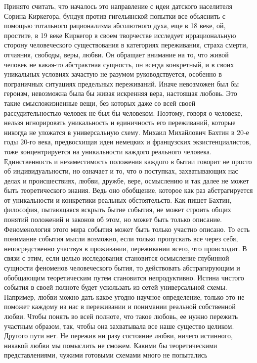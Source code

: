 Принято считать, что началось это
направление с идеи датского населителя Сорина Киркегора, бундуя против
гигельянской попытки все объяснить с помощью тотального рационализма абсолютного
духа, еще в 18 веке, ой, простите, в 19 веке Киркегор в своем творчестве
исследует иррациональную сторону человеческого существования в категориях
переживания, страха смерти, отчаяния, свободы, веры, любви. Он обращает внимание
на то, что живой человек не какая-то абстрактная сущность, он всегда конкретный,
и в своих уникальных условиях зачастую не разумом руководствуется, особенно в
пограничных ситуациях предельных переживаний. Иначе невозможен был бы героизм,
невозможна была бы живая искренняя вера, настоящая любовь. Это такие
смысложизненные вещи, без которых даже со всей своей рассудительностью человек
не был бы человеком. Поэтому, говоря о человеке, нельзя игнорировать
уникальность и единичность его переживаний, которые никогда не уложатся в
универсальную схему. Михаил Михайлович Бахтин в 20-е годы 20-го века,
предвосхищая идеи немецких и французских экзистенциалистов, тоже концентрируется
на уникальности каждого реального человека. Единственность и незаместимость
положения каждого в бытии говорит не просто об индивидуальности, но означает и
то, что о поступках, захватывающих нас делах и происшествиях, любви, дружбе,
вере, осмыслению и так далее не может быть теоретического знания. Ведь оно
обобщение, которое как раз абстрагируется от уникальности и конкретики реальных
обстоятельств. Как пишет Бахтин, философия, пытающаяся вскрыть бытие события, не
может строить общих понятий положений и законов об этом, но может быть только
описание. Феноменология этого мира события может быть только участно описано. То
есть понимание события мысли возможно, если только пропускать все через себя,
непосредственно участвуя в проживании, переживании всего, что происходит. В
связи с этим, если целью исследования становится осмысление глубинной сущности
феноменов человеческого бытия, то действовать абстрагирующим и обобщающим
теоретическим путем становится непродуктивно. Истина чистого события в своей
полноте будет ускользать из сетей универсальной схемы. Например, любви можно
дать какое угодно научное определение, только это не поможет каждому из нас в
переживании и понимании реальной собственной любви. Чтобы понять во всей
полноте, что такое любовь, ее нужно пережить участным образом, так, чтобы она
захватывала все наше существо целиком. Другого пути нет. Не пережив ни разу
состояние любви, ничего истинного, никакой любви мы помыслить не сможем. Какими
бы теоретическими представлениями, чужими готовыми схемами много не попытались
